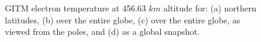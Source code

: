 \begin{figure}
\begin{center}
{}
\caption{GITM electron temperature at 456.63 $km$ altitude for: (a) northern latitudes, (b) over the entire globe, (c) over the entire globe, as viewed from the poles, and (d) as a global snapshot.}
\label{gitm_3D_global_plots.fig}
\end{center}
\end{figure}

\begin{figure}
\begin{center}
\end{center}
\end{figure}
